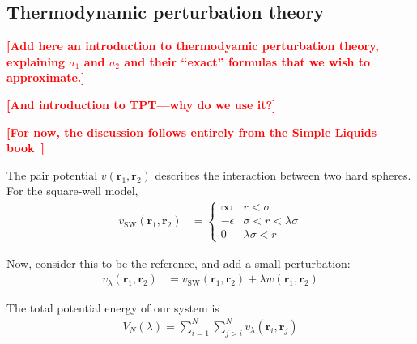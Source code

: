 \documentclass[letterpaper,twocolumn,amsmath,amssymb,prb]{revtex4-1}
\newcommand{\1}{\ensuremath{\textbf{r}_1}}
\newcommand{\2}{\ensuremath{\textbf{r}_2}}
\newcommand{\fixme}[1]{\textcolor{red}{\textbf{[#1]}}}
\begin{document}
\subsection{Thermodynamic perturbation theory}\label{subsec:TPT}
\fixme{Add here an introduction to thermodyamic perturbation theory,
  explaining $a_1$ and $a_2$ and their ``exact'' formulas that we wish
  to approximate.}

\fixme{And introduction to TPT---why do we use it?}

\fixme{For now, the discussion follows entirely from the Simple Liquids book~\cite{Hansen06}}

The pair potential $v(\1,\2)$ describes the interaction between two hard spheres. For the square-well model,
\begin{align}
  v_\text{SW}(\1,\2) &=
    \begin{cases}
      \infty & r < \sigma \\
      -\epsilon & \sigma < r < \lambda\sigma \\
      0 & \lambda\sigma < r
    \end{cases}
\end{align}

Now, consider this to be the reference, and add a small perturbation:
\begin{align}
  v_\lambda(\1,\2) &= v_\text{SW}(\1,\2) + \lambda w(\1,\2) \label{eqn:small-perturbation}
\end{align}

The total potential energy of our system is
\begin{align}
  V_N(\lambda) = \sum_{i=1}^N\sum_{j>i}^N v_\lambda(\mathbf{r}_i,\mathbf{r}_j)
\end{align}
\end{document}
